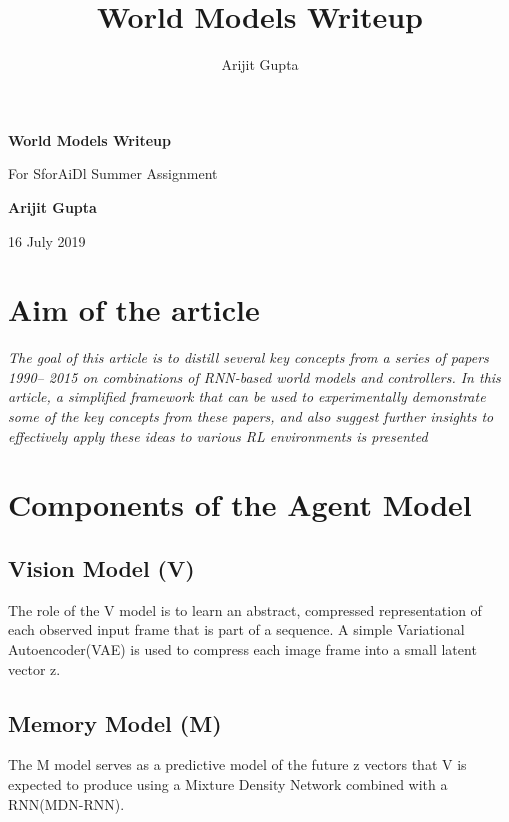 \documentclass[a4paper]{article}
\title{World Models Writeup}
\author{Arijit Gupta}
\begin{document}
\begin{titlepage}
    \begin{center}
        \vspace*{1cm}
        \Huge
        \textbf{World Models Writeup}
        
        \vspace{0.5cm}
        \LARGE
        For SforAiDl Summer Assignment
        
        \vspace{1.5cm}
        \textbf{Arijit Gupta}
        
        \vfill
        16 July 2019
    \end{center}
\end{titlepage}

\section*{{Aim of the article}}

\textit
{The goal of this article\autocite{WEBSITE:1} is to distill several key concepts from a series of papers 1990– 2015 on combinations of RNN-based world models and controllers. In this article, a simplified framework that can be used to experimentally demonstrate some of the key concepts from these papers, and also suggest further insights to effectively apply these ideas to various RL environments is presented}
\section{Components of the Agent Model}
\subsection{Vision Model (V)}
The role of the V model is to learn an abstract, compressed representation of each observed input frame that is part of a sequence. A simple Variational Autoencoder(VAE) is used to compress each image frame into a small latent vector z.
\subsection{Memory Model (M)}
The M model serves as a predictive model of the future z vectors that V is expected to produce using a Mixture Density Network combined with a RNN(MDN-RNN).
\end{document}
